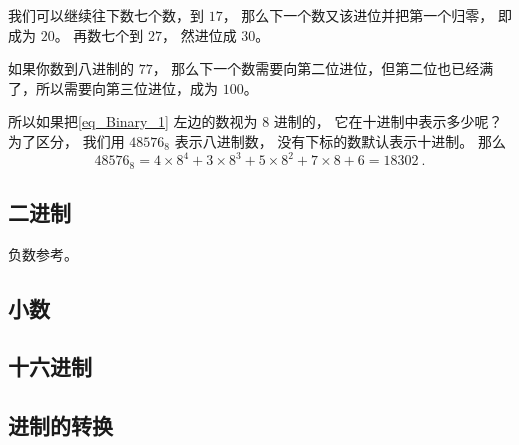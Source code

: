 我们可以继续往下数七个数，到 $17$， 那么下一个数又该进位并把第一个归零， 即成为 $20$。 再数七个到 $27$， 然进位成 $30$。

如果你数到八进制的 $77$， 那么下一个数需要向第二位进位，但第二位也已经满了，所以需要向第三位进位，成为 $100$。

所以如果把\autoref{eq_Binary_1} 左边的数视为 $8$ 进制的， 它在十进制中表示多少呢？ 为了区分， 我们用 $48576_\text{8}$ 表示八进制数， 没有下标的数默认表示十进制。 那么
\begin{equation}
48576_\text{8} = 4\times 8^{4} + 3\times 8^{3} + 5\times 8^{2} + 7\times 8 + 6 = 18302~.
\end{equation}

\subsection{二进制}
负数参考。

\subsection{小数}

\subsection{十六进制}

\subsection{进制的转换}

